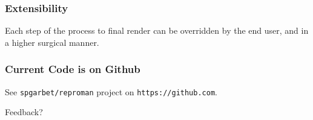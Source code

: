 \documentclass{beamer}
\begin{document}
  \begin{frame}
    \frametitle{Extensibility}
    Each step of the process to final render can be overridden by the end user, and in a higher surgical manner.
  \end{frame}

  \begin{frame}
    \frametitle{Current Code is on Github}
    See \texttt{spgarbet/reproman} project on \texttt{https://github.com}.


    Feedback?
  \end{frame}
\end{document}
